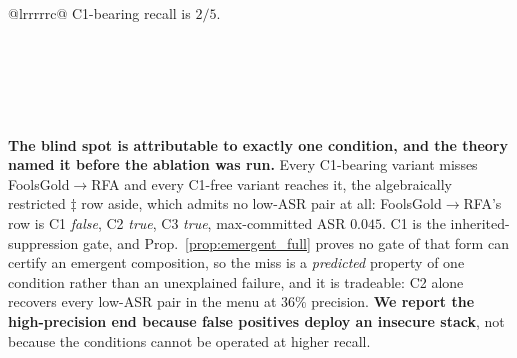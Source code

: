 \documentclass{article}
\begin{document}
\begin{center}
\begin{tabular}{@{}lrrrrrc@{}}
{C1-bearing recall is $2/5$.} \\
 \\
 \\
 \\
 \\
 \\
\end{tabular}
\end{center}

\noindent \textbf{The blind spot is attributable to exactly one condition, and the theory named it
before the ablation was run.} Every C1-bearing variant misses FoolsGold$\to$RFA and every C1-free
variant reaches it, the algebraically restricted $\ddagger$ row aside, which admits no low-ASR pair at
all: FoolsGold$\to$RFA's row is C1 \emph{false}, C2 \emph{true}, C3 \emph{true}, max-committed ASR
$0.045$. C1 is the inherited-suppression gate, and Prop.~\ref{prop:emergent_full} proves no gate of that
form can certify an emergent composition, so the miss is a \emph{predicted} property of one condition
rather than an unexplained failure, and it is tradeable: C2 alone recovers every low-ASR pair in the
menu at $36\%$ precision. \textbf{We report the high-precision end because false positives deploy an
insecure stack}, not because the conditions cannot be operated at higher recall.
\end{document}

